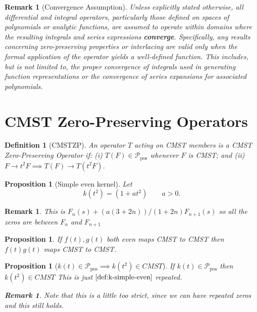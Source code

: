 \documentclass[11pt]{article}
\theoremstyle{breakdef}
\newtheorem{definition}[theorem]{Definition}
\newtheorem{remark}[theorem]{Remark}
\newtheorem{proposition}[theorem]{Proposition}
\begin{document}
\begin{remark}[Convergence Assumption]
\label{rem:convergence}
Unless explicitly stated otherwise, all differential and integral operators, particularly those defined on spaces of polynomials or analytic functions, are assumed to operate within domains where the resulting integrals and series expressions \textbf{converge}. Specifically, any results concerning zero-preserving properties or interlacing are valid only when the formal application of the operator yields a well-defined function. This includes, but is not limited to, the proper convergence of integrals used in generating function representations or the convergence of series expansions for associated polynomials.
\end{remark}

\section{CMST Zero-Preserving Operators}
\begin{definition}[CMSTZP]\label{def:CMSTZP}
An operator $T$ acting on CMST members is a \emph{CMST Zero-Preserving Operator} 
if: (i) $T(F) \in \mathcal{P}_{\mathrm{pos}}$  whenever $F$ is CMST; and (ii) $F \to t^2 F \implies T(F) \to T(t^2F)$.
\end{definition}

\begin{proposition}[Simple even kernel]\label{def:k-simple-even}
Let
\begin{equation}
k(t^2)=(1+a t^2) \qquad a > 0.
\end{equation}
\end{proposition}


\begin{remark}
This is  $F_n(s) + (a(3 + 2n))/(1 + 2n) F_{n+1}(s)$ so all the zeros are between $F_{n}$ and $F_{n+1}$
\end{remark}

\begin{proposition}
If $f(t), g(t)$ both even maps CMST to CMST then $f(t)g(t)$ maps CMST to CMST.
\end{proposition}

\begin{proposition}[$k(t) \in \mathcal{P}_{\mathrm{pos}} \implies k(t^2) \in CMST $]\label{def:k-ppos-even}
If $k(t) \in \mathcal{P}_{\mathrm{pos}}$ then
$k(t^2) \in CMST$
This is just $\cref{def:k-simple-even}$ repeated.  
\begin{remark}
Note that this is a little too strict, since we can have repeated zeros and this still holds.
\end{remark}
\end{proposition}
\end{document}
